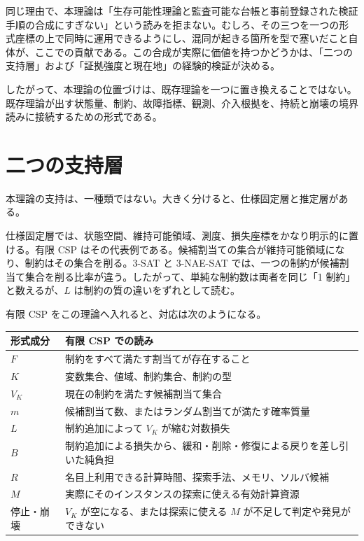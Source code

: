 \documentclass[12pt,a4paper]{article}
\begin{document}
同じ理由で、本理論は「生存可能性理論と監査可能な台帳と事前登録された検証手順の合成にすぎない」という読みを拒まない。むしろ、その三つを一つの形式座標の上で同時に運用できるようにし、混同が起きる箇所を型で塞いだこと自体が、ここでの貢献である。この合成が実際に価値を持つかどうかは、「二つの支持層」および「証拠強度と現在地」の経験的検証が決める。

したがって、本理論の位置づけは、既存理論を一つに置き換えることではない。既存理論が出す状態量、制約、故障指標、観測、介入根拠を、持続と崩壊の境界読みに接続するための形式である。

\section{二つの支持層}\label{ux4e8cux3064ux306eux652fux6301ux5c64}

本理論の支持は、一種類ではない。大きく分けると、仕様固定層と推定層がある。

仕様固定層では、状態空間、維持可能領域、測度、損失座標をかなり明示的に置ける。有限 CSP はその代表例である。候補割当ての集合が維持可能領域になり、制約はその集合を削る。3-SAT と 3-NAE-SAT では、一つの制約が候補割当て集合を削る比率が違う。したがって、単純な制約数は両者を同じ「1 制約」と数えるが、\(L\) は制約の質の違いをずれとして読む。

有限 CSP をこの理論へ入れると、対応は次のようになる。

{\def\LTcaptype{table} %
\begin{longtable}[]{@{}
  >{\raggedright\arraybackslash}p{}
  >{\raggedright\arraybackslash}p{}@{}}
\toprule\noalign{}
\begin{minipage}[b]{\linewidth}\raggedright
形式成分
\end{minipage} & \begin{minipage}[b]{\linewidth}\raggedright
有限 CSP での読み
\end{minipage} \\
\midrule\noalign{}
\endhead
\bottomrule\noalign{}
\endlastfoot
\(F\) & 制約をすべて満たす割当てが存在すること \\
\(K\) & 変数集合、値域、制約集合、制約の型 \\
\(V_K\) & 現在の制約を満たす候補割当て集合 \\
\(m\) & 候補割当て数、またはランダム割当てが満たす確率質量 \\
\(L\) & 制約追加によって \(V_K\) が縮む対数損失 \\
\(B\) & 制約追加による損失から、緩和・削除・修復による戻りを差し引いた純負担 \\
\(R\) & 名目上利用できる計算時間、探索手法、メモリ、ソルバ候補 \\
\(M\) & 実際にそのインスタンスの探索に使える有効計算資源 \\
停止・崩壊 & \(V_K\) が空になる、または探索に使える \(M\) が不足して判定や発見ができない \\
\end{longtable}
}
\end{document}
